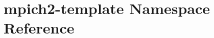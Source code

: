 \hypertarget{namespacempich2-template}{\section{mpich2-\/template Namespace Reference}
\label{namespacempich2-template}
}
